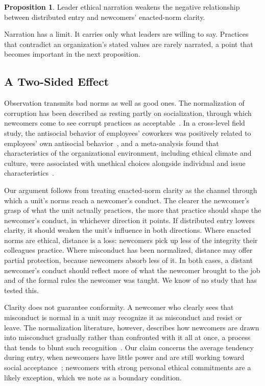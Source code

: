 \documentclass[12pt,a4paper]{article}
\theoremstyle{definition}
\newtheorem{proposition}{Proposition}
\begin{document}
\begin{proposition}
Leader ethical narration weakens the negative relationship between distributed entry and newcomers' enacted-norm clarity.
\end{proposition}

Narration has a limit. It carries only what leaders are willing to say. Practices that contradict an organization's stated values are rarely narrated, a point that becomes important in the next proposition.

\subsection{A Two-Sided Effect}

Observation transmits bad norms as well as good ones. The normalization of corruption has been described as resting partly on socialization, through which newcomers come to see corrupt practices as acceptable~\citep{ashforth2003normalization}. In a cross-level field study, the antisocial behavior of employees' coworkers was positively related to employees' own antisocial behavior~\citep{robinson1998monkey}, and a meta-analysis found that characteristics of the organizational environment, including ethical climate and culture, were associated with unethical choices alongside individual and issue characteristics~\citep{kishgephart2010bad}.

Our argument follows from treating enacted-norm clarity as the channel through which a unit's norms reach a newcomer's conduct. The clearer the newcomer's grasp of what the unit actually practices, the more that practice should shape the newcomer's conduct, in whichever direction it points. If distributed entry lowers clarity, it should weaken the unit's influence in both directions. Where enacted norms are ethical, distance is a loss: newcomers pick up less of the integrity their colleagues practice. Where misconduct has been normalized, distance may offer partial protection, because newcomers absorb less of it. In both cases, a distant newcomer's conduct should reflect more of what the newcomer brought to the job and of the formal rules the newcomer was taught. We know of no study that has tested this.

Clarity does not guarantee conformity. A newcomer who clearly sees that misconduct is normal in a unit may recognize it as misconduct and resist or leave. The normalization literature, however, describes how newcomers are drawn into misconduct gradually rather than confronted with it all at once, a process that tends to blunt such recognition~\citep{ashforth2003normalization}. Our claim concerns the average tendency during entry, when newcomers have little power and are still working toward social acceptance~\citep{bauer2007newcomer}; newcomers with strong personal ethical commitments are a likely exception, which we note as a boundary condition.
\end{document}
